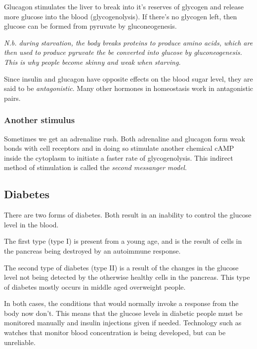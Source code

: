 \documentclass{article}
\begin{document}
Glucagon stimulates the liver to break into it's reserves of glycogen and
release more glucose into the blood (glycogenolysis). If there's no glycogen
left, then glucose can be formed from pyruvate by gluconeogenesis.

{\it N.b. during starvation, the body breaks proteins to produce amino acids,
which are then used to produce pyruvate the be converted into glucose by
gluconeogenesis. This is why people become skinny and weak when starving.}

Since insulin and glucagon have opposite effects on the blood sugar level, they
are said to be {\it antagonistic}. Many other hormones in homeostasis work in
antagonistic pairs.

\subsubsection*{Another stimulus}

Sometimes we get an adrenaline rush. Both adrenaline and glucagon form weak
bonds with cell receptors and in doing so stimulate another chemical cAMP inside
the cytoplasm to initiate a faster rate of glycogenolysis. This indirect method
of stimulation is called the {\it second messanger model}.

\subsection*{Diabetes}

There are two forms of diabetes. Both result in an inability to control the
glucose level in the blood.

The first type (type I) is present from a young age, and is the result of cells
in the pancreas being destroyed by an autoimmune response.

The second type of diabetes (type II) is a result of the changes in the glucose
level not being detected by the otherwise healthy cells in the pancreas. This
type of diabetes mostly occurs in middle aged overweight people.

In both cases, the conditions that would normally invoke a response from the
body now don't. This means that the glucose levels in diabetic people must be
monitored manually and insulin injections given if needed. Technology such as
watches that monitor blood concentration is being developed, but can be
unreliable.
\end{document}
